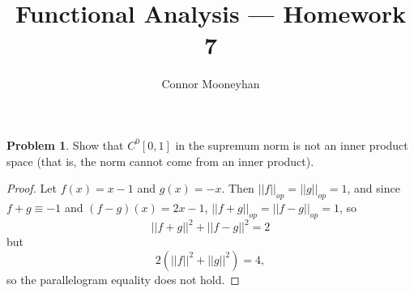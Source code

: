 \documentclass[12pt]{article}
\title{Functional Analysis --- Homework 7}
\author{Connor Mooneyhan}
\date{}
\theoremstyle{definition}
\newtheorem{ex}{Problem}
\begin{document}
\maketitle

\begin{ex}
	Show that $C^0[0, 1]$ in the supremum norm is not an inner product space (that is, the norm cannot come from an inner product).
\end{ex}
\begin{proof}
	Let $f(x) = x - 1$ and $g(x) = -x$.
	Then $||f||_{op} = ||g||_{op} = 1$, and since $f + g \equiv -1$ and $(f-g)(x) = 2x-1$, $||f+g||_{op} = ||f - g||_{op} = 1$, so\begin{equation*}
		||f+g||^2 + ||f-g||^2 = 2
	\end{equation*} but \begin{equation*}
		2(||f||^2 + ||g||^2) = 4,
	\end{equation*}
	so the parallelogram equality does not hold.
\end{proof}
\end{document}
